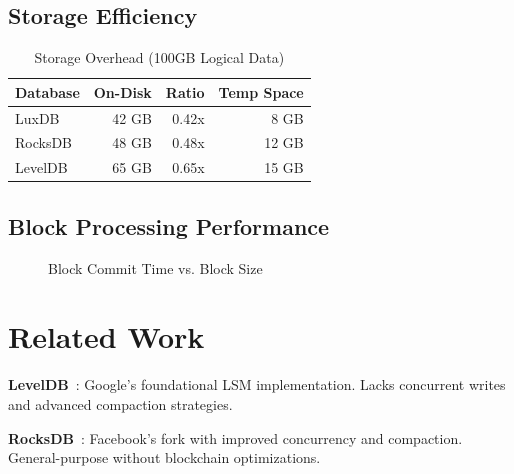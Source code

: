 \documentclass[11pt,a4paper]{article}
\begin{document}
\subsection{Storage Efficiency}

\begin{table}[htbp]
\centering
\caption{Storage Overhead (100GB Logical Data)}
\begin{tabular}{lrrr}
\toprule
\textbf{Database} & \textbf{On-Disk} & \textbf{Ratio} & \textbf{Temp Space} \\
\midrule
LuxDB & 42 GB & 0.42x & 8 GB \\
RocksDB & 48 GB & 0.48x & 12 GB \\
LevelDB & 65 GB & 0.65x & 15 GB \\
\bottomrule
\end{tabular}
\label{tab:storage}
\end{table}

\subsection{Block Processing Performance}

\begin{figure}[htbp]
\centering
{}
\caption{Block Commit Time vs. Block Size}
\label{fig:blocktime}
\end{figure}

\section{Related Work}

\textbf{LevelDB}~\cite{leveldb}: Google's foundational LSM implementation. Lacks concurrent writes and advanced compaction strategies.

\textbf{RocksDB}~\cite{rocksdb}: Facebook's fork with improved concurrency and compaction. General-purpose without blockchain optimizations.
\end{document}
